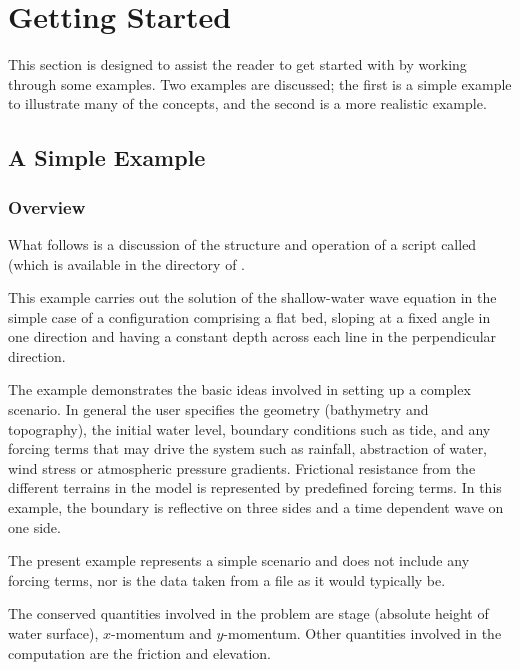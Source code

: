 \documentclass{manual}
\begin{document}

\chapter{Getting Started}
\label{ch:getstarted}

This section is designed to assist the reader to get started with
\anuga by working through some examples. Two examples are discussed;
the first is a simple example to illustrate many of the concepts, and
the second is a more realistic example.


\section{A Simple Example}
\label{sec:simpleexample}

\subsection{Overview}

What follows is a discussion of the structure and operation of a
script called  (which is available in the  directory 
of .

This example carries out the solution of the shallow-water wave
equation in the simple case of a configuration comprising a flat
bed, sloping at a fixed angle in one direction and having a
constant depth across each line in the perpendicular direction.

The example demonstrates the basic ideas involved in setting up a
complex scenario. In general the user specifies the geometry
(bathymetry and topography), the initial water level, boundary
conditions such as tide, and any forcing terms that may drive the
system such as rainfall, abstraction of water, wind stress or atmospheric pressure gradients.
Frictional resistance from the different terrains in the model is
represented by predefined forcing terms. In this example, the
boundary is reflective on three sides and a time dependent wave on
one side.

The present example represents a simple scenario and does not
include any forcing terms, nor is the data taken from a file as it
would typically be.

The conserved quantities involved in the
problem are stage (absolute height of water surface),
$x$-momentum and $y$-momentum. Other quantities
involved in the computation are the friction and elevation.
\end{document}
